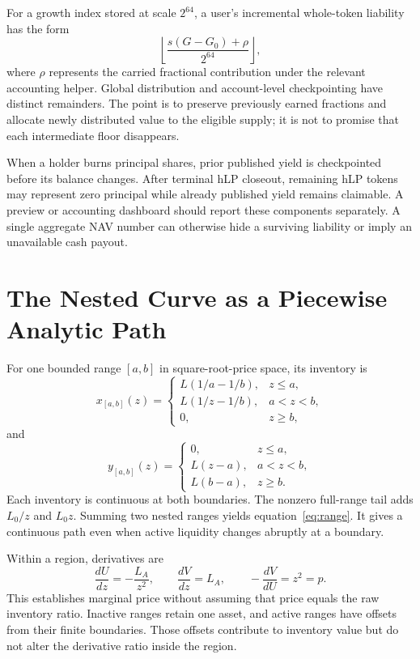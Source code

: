 For a growth index stored at scale $2^{64}$, a user's incremental whole-token liability has the form
\[
\left\lfloor\frac{s(G-G_0)+\rho}{2^{64}}\right\rfloor,
\]
where $\rho$ represents the carried fractional contribution under the relevant accounting helper. Global distribution and account-level checkpointing have distinct remainders. The point is to preserve previously earned fractions and allocate newly distributed value to the eligible supply; it is not to promise that each intermediate floor disappears.

When a holder burns principal shares, prior published yield is checkpointed before its balance changes. After terminal hLP closeout, remaining hLP tokens may represent zero principal while already published yield remains claimable. A preview or accounting dashboard should report these components separately. A single aggregate NAV number can otherwise hide a surviving liability or imply an unavailable cash payout.

\section{The Nested Curve as a Piecewise Analytic Path}
\label{app:curve}

For one bounded range $[a,b]$ in square-root-price space, its inventory is
\begin{equation}
x_{[a,b]}(z)=\begin{cases}
L(1/a-1/b),&z\le a,\\
L(1/z-1/b),&a<z<b,\\
0,&z\ge b,
\end{cases}
\end{equation}
and
\begin{equation}
y_{[a,b]}(z)=\begin{cases}
0,&z\le a,\\
L(z-a),&a<z<b,\\
L(b-a),&z\ge b.
\end{cases}
\end{equation}
Each inventory is continuous at both boundaries. The nonzero full-range tail adds $L_0/z$ and $L_0z$. Summing two nested ranges yields equation~\eqref{eq:range}. It gives a continuous path even when active liquidity changes abruptly at a boundary.

Within a region, derivatives are
\[
\frac{dU}{dz}=-\frac{L_A}{z^2},\qquad
\frac{dV}{dz}=L_A,\qquad
-\frac{dV}{dU}=z^2=p.
\]
This establishes marginal price without assuming that price equals the raw inventory ratio. Inactive ranges retain one asset, and active ranges have offsets from their finite boundaries. Those offsets contribute to inventory value but do not alter the derivative ratio inside the region.

